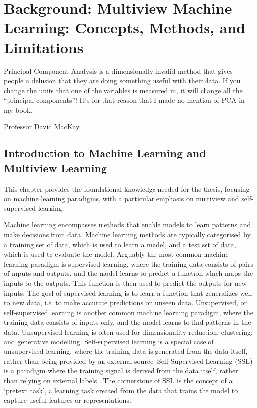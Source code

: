 \graphicspath{{chapters/background/}}


\chapter{Background: Multiview Machine Learning: Concepts, Methods, and Limitations}\label{ch:background}
 \epigraph{Principal Component Analysis is a dimensionally invalid method that gives people a delusion that they are doing something useful with their data. If you change the units that one of the variables is measured in, it will change all the “principal components”! It’s for that reason that I made no mention of PCA in my book.}{Professor David MacKay}
\minitoc

\section{Introduction to Machine Learning and Multiview Learning}

This chapter provides the foundational knowledge needed for the thesis, focusing on machine learning paradigms, with a particular emphasis on multiview and self-supervised learning.

Machine learning encompasses methods that enable models to learn patterns and make decisions from data.
Machine learning methods are typically categorised by a training set of data, which is used to learn a model, and a test set of data, which is used to evaluate the model.
Arguably the most common machine learning paradigm is supervised learning, where the training data consists of pairs of inputs and outputs, and the model learns to predict a function which maps the inputs to the outputs.
This function is then used to predict the outputs for new inputs.
The goal of supervised learning is to learn a function that generalizes well to new data, i.e. to make accurate predictions on unseen data.
Unsupervised, or self-supervised learning is another common machine learning paradigm, where the training data consists of inputs only, and the model learns to find patterns in the data.
Unsupervised learning is often used for dimensionality reduction, clustering, and generative modelling.
Self-supervised learning is a special case of unsupervised learning, where the training data is generated from the data itself, rather than being provided by an external source.
Self-Supervised Learning (SSL) is a paradigm where the training signal is derived from the data itself, rather than relying on external labels \citep{balestriero2023cookbook}.
The cornerstone of SSL is the concept of a `pretext task', a learning task created from the data that trains the model to capture useful features or representations.


